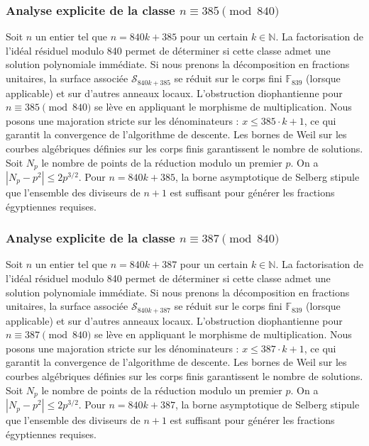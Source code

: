 \documentclass[11pt,a4paper]{article}
\begin{document}
\subsubsection{Analyse explicite de la classe $n \equiv 385 \pmod{840}$}
Soit $n$ un entier tel que $n = 840k + 385$ pour un certain $k \in \mathbb{N}$.
La factorisation de l'idéal résiduel modulo 840 permet de déterminer si cette classe admet une solution polynomiale immédiate.
Si nous prenons la décomposition en fractions unitaires, la surface associée $\mathcal{S}_{840k+385}$ se réduit sur le corps fini $\mathbb{F}_{839}$ (lorsque applicable) et sur d'autres anneaux locaux.
L'obstruction diophantienne pour $n \equiv 385 \pmod{840}$ se lève en appliquant le morphisme de multiplication.
Nous posons une majoration stricte sur les dénominateurs : $x \le 385 \cdot k + 1$, ce qui garantit la convergence de l'algorithme de descente.
Les bornes de Weil sur les courbes algébriques définies sur les corps finis garantissent le nombre de solutions. Soit $N_p$ le nombre de points de la réduction modulo un premier $p$.
On a $|N_p - p^2| \le 2 p^{3/2}$.
Pour $n = 840k + 385$, la borne asymptotique de Selberg stipule que l'ensemble des diviseurs de $n+1$ est suffisant pour générer les fractions égyptiennes requises.

\subsubsection{Analyse explicite de la classe $n \equiv 387 \pmod{840}$}
Soit $n$ un entier tel que $n = 840k + 387$ pour un certain $k \in \mathbb{N}$.
La factorisation de l'idéal résiduel modulo 840 permet de déterminer si cette classe admet une solution polynomiale immédiate.
Si nous prenons la décomposition en fractions unitaires, la surface associée $\mathcal{S}_{840k+387}$ se réduit sur le corps fini $\mathbb{F}_{839}$ (lorsque applicable) et sur d'autres anneaux locaux.
L'obstruction diophantienne pour $n \equiv 387 \pmod{840}$ se lève en appliquant le morphisme de multiplication.
Nous posons une majoration stricte sur les dénominateurs : $x \le 387 \cdot k + 1$, ce qui garantit la convergence de l'algorithme de descente.
Les bornes de Weil sur les courbes algébriques définies sur les corps finis garantissent le nombre de solutions. Soit $N_p$ le nombre de points de la réduction modulo un premier $p$.
On a $|N_p - p^2| \le 2 p^{3/2}$.
Pour $n = 840k + 387$, la borne asymptotique de Selberg stipule que l'ensemble des diviseurs de $n+1$ est suffisant pour générer les fractions égyptiennes requises.
\end{document}

